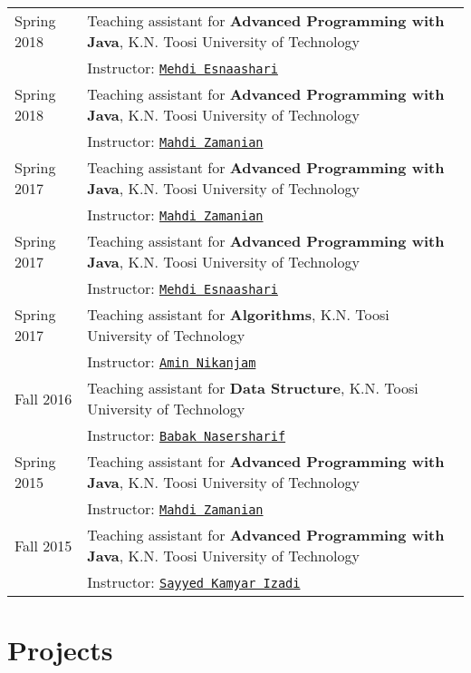 \documentclass[letterpaper]{article}
\begin{document}
{{{\renewcommand{\arraystretch}{1.2}
\begin{tabular}{l l}
Spring 2018 & Teaching assistant for \textbf{Advanced Programming with Java}, K.N. Toosi University of Technology\\&Instructor: \href{https://scholar.google.com/citations?hl=en&user=kf0UQKMAAAAJ}{\tt Mehdi Esnaashari} 
\\
Spring 2018 & Teaching assistant for \textbf{Advanced Programming with Java}, K.N. Toosi University of Technology\\&Instructor: \href{http://wp.kntu.ac.ir/zamanian/}{\tt Mahdi Zamanian} 
\\
Spring 2017 & Teaching assistant for \textbf{Advanced Programming with Java}, K.N. Toosi University of Technology\\&Instructor: \href{http://wp.kntu.ac.ir/zamanian/}{\tt Mahdi Zamanian} 
\\
Spring 2017 & Teaching assistant for \textbf{Advanced Programming with Java}, K.N. Toosi University of Technology\\&Instructor: \href{https://scholar.google.com/citations?hl=en&user=kf0UQKMAAAAJ}{\tt Mehdi Esnaashari} 
\\
Spring 2017 & Teaching assistant for \textbf{Algorithms}, K.N. Toosi University of Technology\\&Instructor: \href{https://scholar.google.com/citations?user=mGF6p48AAAAJ&hl=en}{\tt Amin Nikanjam} 
\\
Fall 2016 & Teaching assistant for \textbf{Data Structure}, K.N. Toosi University of Technology\\&Instructor: \href{http://wp.kntu.ac.ir/bnasersharif/}{\tt Babak Nasersharif} 
\\
Spring 2015 & Teaching assistant for \textbf{Advanced Programming with Java}, K.N. Toosi University of Technology\\&Instructor: \href{http://wp.kntu.ac.ir/zamanian/}{\tt Mahdi Zamanian} 
\\
Fall 2015 & Teaching assistant for \textbf{Advanced Programming with Java}, K.N. Toosi University of Technology\\&Instructor: \href{http://wwwlgis.informatik.uni-kl.de/cms/dbis/staff/formermembers/izadi/}{\tt Sayyed Kamyar Izadi} 
\end{tabular}

\section*{Projects}

}}}
\end{document}
